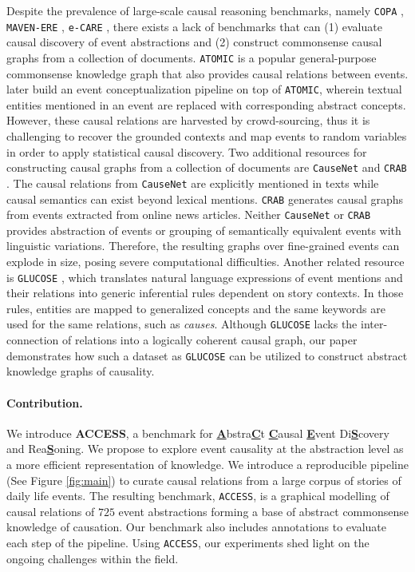 Despite the prevalence of large-scale causal reasoning benchmarks, namely \texttt{COPA} \citep{roemmele2011choice}, \texttt{MAVEN-ERE} \citep{wang-etal-2022-maven}, \texttt{e-CARE} \citep{du-etal-2022-e}, 
there exists a lack of benchmarks that can (1) evaluate causal discovery of event abstractions and (2) construct commonsense causal graphs from a collection of documents. \texttt{ATOMIC} \cite{sap2019atomic,hwang2021comet} is a popular general-purpose commonsense knowledge graph that also provides causal relations between events. \citet{he2022acquiring} later build an event conceptualization pipeline on top of \texttt{ATOMIC}, wherein textual entities mentioned in an event are replaced with corresponding abstract concepts. However, these causal relations are harvested by crowd-sourcing, thus it is challenging to recover the grounded contexts and map events to random variables in order to apply statistical causal discovery. Two additional resources for constructing causal graphs from a collection of documents are \texttt{CauseNet} \citep{heindorf2020causenet} and \texttt{CRAB} \cite{romanou2023crab}. 
The causal relations from \texttt{CauseNet} are explicitly mentioned in texts while causal semantics can exist beyond lexical mentions. \texttt{CRAB} generates causal graphs from events extracted from online news articles. Neither \texttt{CauseNet} or \texttt{CRAB} provides abstraction of events or grouping of semantically equivalent events with linguistic variations. Therefore, the resulting graphs over fine-grained events can explode in size, posing severe computational difficulties.  Another related resource is \texttt{GLUCOSE} \cite{mostafazadeh-etal-2020-glucose}, which translates natural language expressions of event mentions and their relations into generic inferential rules dependent on story contexts. In those rules, entities are mapped to generalized concepts and the same keywords are used for the same relations, such as \textit{causes}. Although \texttt{GLUCOSE} lacks the inter-connection of relations into a logically coherent causal graph, our paper demonstrates how such a dataset as \texttt{GLUCOSE} can be utilized to construct abstract knowledge graphs of causality.

\paragraph{Contribution.}
We introduce \textbf{ACCESS}, a benchmark for \underline{\textbf{A}}bstra\underline{\textbf{C}}t \underline{\textbf{C}}ausal \underline{\textbf{E}}vent Di\underline{\textbf{S}}covery and Rea\underline{\textbf{S}}oning. We propose to explore event causality at the abstraction level as a more efficient representation of knowledge. 
We introduce a reproducible pipeline (See Figure \ref{fig:main}) to curate causal relations from a large corpus of stories of daily life events. The resulting benchmark, \texttt{ACCESS}, is a graphical modelling of causal relations of $725$ event abstractions forming a base of abstract commonsense knowledge of causation. Our benchmark also includes annotations to evaluate each step of the pipeline. Using \texttt{ACCESS}, our experiments shed light on the ongoing challenges within the field. 

